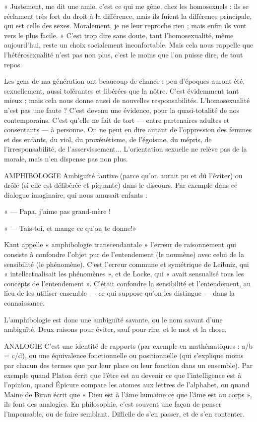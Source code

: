 « Justement, me dit une amie, c’est ce qui me gêne, chez les homosexuels :
ils se réclament très fort du droit à la différence, mais ils fuient la différence
principale, qui est celle des sexes. Moralement, je ne leur reproche rien ; mais
enfin ils vont vers le plus facile. » C’est trop dire sans doute, tant l’homosexualité,
même aujourd’hui, reste un choix socialement inconfortable. Mais
cela nous rappelle que l’hétérosexualité n’est pas non plus, c’est le moins que
l’on puisse dire, de tout repos.

Les gens de ma génération ont beaucoup de chance : peu d’époques auront
été, sexuellement, aussi tolérantes et libérées que la nôtre. C’est évidemment
tant mieux ; mais cela nous donne aussi de nouvelles responsabilités. L’homosexualité
n’est pas une faute ? C’est devenu une évidence, pour la quasi-totalité
de nos contemporains. C’est qu’elle ne fait de tort — entre partenaires adultes et
consentants — à personne. On ne peut en dire autant de l'oppression des
femmes et des enfants, du viol, du proxénétisme, de l’égoisme, du mépris, de
l’irresponsabilité, de l’asservissement... L'orientation sexuelle ne relève pas de
la morale, mais n’en dispense pas non plus.

AMPHIBOLOGIE Ambiguïté fautive (parce qu’on aurait pu et dû l’éviter) ou
drôle (si elle est délibérée et piquante) dans le discours.
Par exemple dans ce dialogue imaginaire, qui nous amusait enfants :

« — Papa, j'aime pas grand-mère !

« — Tais-toi, et mange ce qu’on te donne!»

Kant appelle « amphibologie transcendantale » l'erreur de raisonnement
qui consiste à confondre l’objet pur de l’entendement (le noumène) avec celui
de la sensibilité (le phénomène). C’est l’erreur commune et symétrique de Leibniz,
qui « intellectualisait les phénomènes », et de Locke, qui « avait sensualisé
tous les concepts de l’entendement ». C’était confondre la sensibilité et l’entendement,
au lieu de les utiliser ensemble — ce qui suppose qu’on les distingue —
dans la connaissance.

L’amphibologie est donc une ambiguïté savante, ou le nom savant d’une
ambiguïté. Deux raisons pour éviter, sauf pour rire, et le mot et la chose.

ANALOGIE C’est une identité de rapports (par exemple en mathématiques :
a/b = c/d), ou une équivalence fonctionnelle ou positionnelle
(qui s'explique moins par chacun des termes que par leur place ou leur fonction
dans un ensemble). Par exemple quand Platon écrit que l’être est au devenir ce
que l'intelligence est à l'opinion, quand Épicure compare les atomes aux lettres
de l’alphabet, ou quand Maine de Biran écrit que « Dieu est à l’âme humaine
ce que l’âme est au corps », ils font des analogies. En philosophie, c’est souvent
une façon de penser l’impensable, ou de faire semblant. Difficile de s’en passer,
et de s’en contenter.

